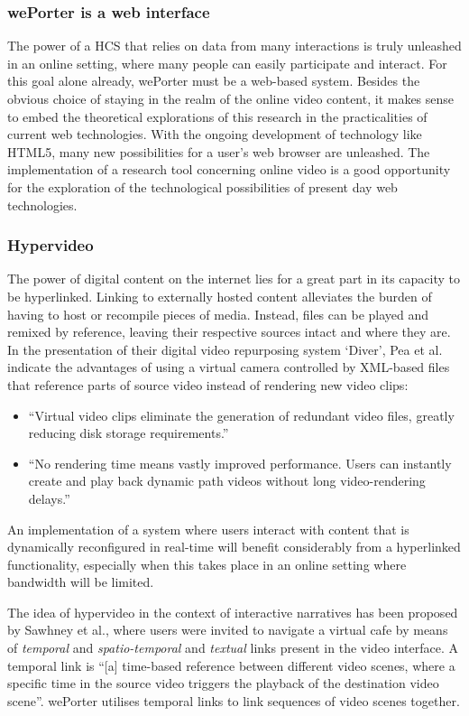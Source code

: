 \subsubsection{wePorter is a web interface}
The power of a HCS that relies on data from many interactions is truly unleashed in an online setting, where many people can easily participate and interact. For this goal alone already, wePorter must be a web-based system.
Besides the obvious choice of staying in the realm of the online video content, it makes sense to embed the theoretical explorations of this research in the practicalities of current web technologies. With the ongoing development of technology like HTML5, many new possibilities for a user's web browser are unleashed. The implementation of a research tool concerning online video is a good opportunity for the exploration of the technological possibilities of present day web technologies.

\subsubsection{Hypervideo}
The power of digital content on the internet lies for a great part in its capacity to be hyperlinked. Linking to externally hosted content alleviates the burden of having to host or recompile pieces of media. Instead, files can be played and remixed by reference, leaving their respective sources intact and where they are. In the presentation of their digital video repurposing system `Diver', Pea et al. indicate the advantages of using a virtual camera controlled by XML-based files that reference parts of source video instead of rendering new video clips\cite{Pea:2004td}:

\begin{itemize}
  \item ``Virtual video clips eliminate the generation of redundant video files, greatly reducing disk storage requirements.''
  \item ``No rendering time means vastly improved performance. Users can instantly create and play back dynamic path videos without long video-rendering delays.''
\end{itemize}

An implementation of a system where users interact with content that is dynamically reconfigured in real-time will benefit considerably from a hyperlinked functionality, especially when this takes place in an online setting where bandwidth will be limited.

The idea of hypervideo in the context of interactive narratives has been proposed by  Sawhney et al., where users were invited to navigate a virtual cafe by means of \emph{temporal} and \emph{spatio-temporal} and \emph{textual} links present in the video interface. A temporal link is  ``[a]	time-based	reference	between different video scenes, where a specific time in the source video triggers the playback of the destination video scene''\cite{Sawhney:1996tk}. wePorter utilises temporal links to link sequences of video scenes together.

